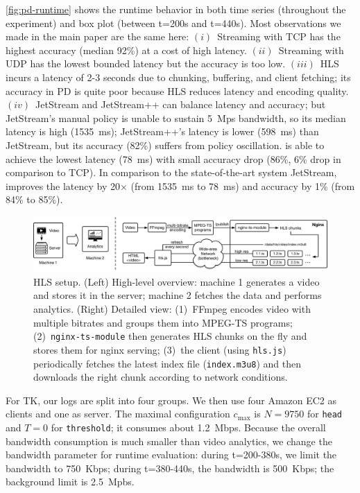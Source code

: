 \documentclass[twocolumn]{article}
\begin{document}
\autoref{fig:pd-runtime} shows the runtime behavior in both time series
(throughout the experiment) and box plot (between t=200s and t=440s).  Most
observations we made in the main paper are the same here: $(i)$~Streaming with
TCP has the highest accuracy (median 92\%) at a cost of high
latency. $(ii)$~Streaming with UDP has the lowest bounded latency but the
accuracy is too low. $(iii)$~HLS incurs a latency of 2-3 seconds due to
chunking, buffering, and client fetching; its accuracy in PD is quite poor
because HLS reduces latency and encoding quality. $(iv)$~JetStream and
JetStream++ can balance latency and accuracy; but JetStream's manual policy is
unable to sustain \SI{5}{Mps} bandwidth, so its median latency is high
(\SI{1535}{\ms}); JetStream++'s latency is lower (\SI{598}{\ms}) than JetStream,
but its accuracy (82\%) suffers from policy oscillation. \sysname{} is able to
achieve the lowest latency (\SI{78}{ms}) with small accuracy drop (86\%, 6\%
drop in comparison to TCP). In comparison to the state-of-the-art system
JetStream, \sysname{} improves the latency by 20$\times$ (from \SI{1535}{ms} to
\SI{78}{ms}) and accuracy by 1\% (from 84\% to 85\%).

\begin{figure}[t]
  \centering
  \includegraphics[width=\textwidth]{figures/hls-arch.pdf}
  \caption{HLS setup. (Left) High-level overview: machine 1 generates a video
    and stores it in the server; machine 2 fetches the data and performs
    analytics. (Right) Detailed view: (1)~FFmpeg encodes video with multiple
    bitrates and groups them into MPEG-TS programs; (2)~\texttt{nginx-ts-module}
    then generates HLS chunks on the fly and stores them for nginx serving;
    (3)~the client (using \texttt{hls.js}) periodically fetches the latest index
    file (\texttt{index.m3u8}) and then downloads the right chunk according to
    network conditions.}
  \label{fig:hls-arch}
\end{figure}

 For TK, our logs are split into four groups. We then use four
Amazon EC2 as clients and one as server. The maximal configuration $c_{\max}$ is
$N=9750$ for \texttt{head} and $T=0$ for \texttt{threshold}; it consumes about
\SI{1.2}{Mbps}. Because the overall bandwidth consumption is much smaller than
video analytics, we change the bandwidth parameter for runtime evaluation:
during t=200-380s, we limit the bandwidth to \SI{750}{Kbps}; during t=380-440s,
the bandwidth is \SI{500}{Kbps}; the background limit is \SI{2.5}{Mpbs}.
\end{document}
